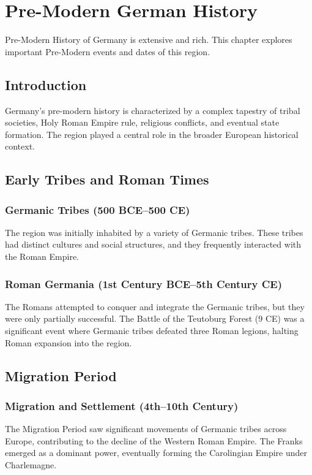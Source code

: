 \documentclass[a4paper,12pt]{book}
\begin{document}
\chapter{Pre-Modern German History}
\label{ch:pre-modern-german-history}

Pre-Modern History of Germany is extensive and rich. This chapter explores important Pre-Modern events and dates of this region.

\section{Introduction}
\label{sec:introduction-pre-modern-germany}
Germany’s pre-modern history is characterized by a complex tapestry of tribal societies, Holy Roman Empire rule, religious conflicts, and eventual state formation. The region played a central role in the broader European historical context.

\section{Early Tribes and Roman Times}
\label{sec:early-tribes-roman-times}
\subsection{Germanic Tribes (500 BCE–500 CE)}
The region was initially inhabited by a variety of Germanic tribes. These tribes had distinct cultures and social structures, and they frequently interacted with the Roman Empire.

\subsection{Roman Germania (1st Century BCE–5th Century CE)}
The Romans attempted to conquer and integrate the Germanic tribes, but they were only partially successful. The Battle of the Teutoburg Forest (9 CE) was a significant event where Germanic tribes defeated three Roman legions, halting Roman expansion into the region.

\section{Migration Period}
\label{sec:migration-period}
\subsection{Migration and Settlement (4th–10th Century)}
The Migration Period saw significant movements of Germanic tribes across Europe, contributing to the decline of the Western Roman Empire. The Franks emerged as a dominant power, eventually forming the Carolingian Empire under Charlemagne.
\end{document}
